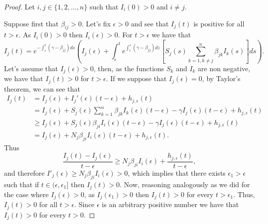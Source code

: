 \documentclass[a4paper,10pt]{article}
\theoremstyle{remark}
\begin{document}
\begin{proof} 

Let $i,j\in \{1,2,\ldots,n\}$ such that $I_i(0)>0$ and $i \neq j$. 

Suppose first that $\beta_{ij}>0$. 
Let's fix $\epsilon>0$ and see that $I_j(t)$ is positive for all  $t>\epsilon$. As $I_i(0)>0$ then $I_i(\epsilon)>0$. For $t>\epsilon$ we have that
\begin{equation*}
I_j(t)=e^{-\int_{\epsilon}^{t}(\gamma-\beta_{jj}) ds}\left(I_j(\epsilon)+\int_{\epsilon}^{t}e^{\int_{\epsilon}^{s}(\gamma-\beta_{jj}) dz}\left[S_j(s)\sum_{k=1,k\neq j}^{n}\beta_{jk}I_k(s)\right]ds\right).
\end{equation*}
Let's assume that $I_j(\epsilon)>0$, then, as the functions $S_k$ and $I_k$ are non negative, we have that $I_j(t)>0$ for $t>\epsilon$. If  we suppose that $I_j(\epsilon)=0$,
by Taylor's theorem, we can see that
\begin{equation*}
\begin{split}
I_j(t)&=I_j(\epsilon)+I_j'(\epsilon)(t-\epsilon)+h_{j,\epsilon}(t)\\
&=I_j(\epsilon)+S_j(\epsilon)\sum_{k=1}^{n}\beta_{jk}I_k(\epsilon)(t-\epsilon)-\gamma I_j(\epsilon)(t-\epsilon)+h_{j,\epsilon}(t)\\
&\geq I_j(\epsilon)+S_j(\epsilon)\beta_{ji}I_i(\epsilon)(t-\epsilon)-\gamma I_j(\epsilon)(t-\epsilon)+h_{j,\epsilon}(t)\\
&=I_j(\epsilon)+N_j\beta_{ji}I_i(\epsilon)(t-\epsilon)+h_{j,\epsilon}(t).
\end{split}
\end{equation*}
Thus
\begin{equation*}
\frac{I_j(t)-I_j(\epsilon)}{t-\epsilon}\geq N_j\beta_{ji}I_i(\epsilon)+\frac{h_{j,\epsilon}(t)}{t-\epsilon},
\end{equation*}
and therefore $I'_j(\epsilon)\geq N_j\beta_{ji}I_i(\epsilon)>0$, which implies that there exists $\epsilon_1>\epsilon$  such that if $t\in (\epsilon,\epsilon_1]$ then $I_j(t)>0$. Now,  reasoning analogously as we did for the case where $I_j(\epsilon)>0$, as  $I_j\left(\epsilon_1\right)>0$ then $I_j(t)>0$ for every $t>\epsilon_1$. Thus, $I_j(t)>0$ for all $t>\epsilon$. Since $\epsilon$ is an arbitrary positive number we have that $I_j(t)>0$ for every $t>0$.


\end{proof}
\end{document}
